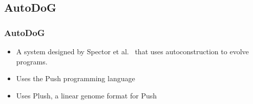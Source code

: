 \documentclass{beamer}
\newcommand{\linespace}{\vskip 0.25cm}
\begin{document}
\subsection{AutoDoG}

\begin{frame}
	\frametitle{AutoDoG}
	\begin{itemize}
		\item A system designed by Spector et al.~\cite{spector:2016} that uses autoconstruction to evolve programs.
		\linespace
		\pause
		\item Uses the Push programming language
		\linespace
		\pause
		\item Uses Plush, a linear genome format for Push
	\end{itemize}	
\end{frame}
\end{document}
